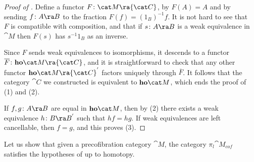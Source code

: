 \begin{proof}[Proof of ]
Define a functor $F \colon {\cat M} \ra {\cat C}$, by $F(A) = A$ and by sending $f \colon A \ra B$ to the fraction $F(f) = (1_B)^{-1}f$. It is not hard to see that $F$ is compatible with composition, and that if $s \colon A \ra B$ is a weak equivalence in ${\cat M}$ then $F(s)$ has $s^{-1}1_B$ as an inverse. 

Since $F$ sends weak equivalences to isomorphisms, it descends to a functor $\overline{F} \colon {\bf ho}{\cat M} \ra {\cat C}$, and it is straightforward to check that any other functor ${\bf ho}{\cat M} \ra {\cat C}^{'}$ factors uniquely through $\overline{F}$. It follows that the category ${\cat C}$ we constructed is equivalent to ${\bf ho}{\cat M}$, which ends the proof of (1) and (2).

If $f, g \colon A \ra B$ are equal in ${\bf ho}{\cat M}$, then by (2) there exists a weak equivalence $h \colon B \ra B^{'}$ such that $hf = hg$. If weak equivalences are left cancellable, then $f = g$, and this proves (3).
\end{proof}

Let us show that given a precofibration category ${\cat M}$, the category $\pi_l {\cat M}_{cof}$ satisfies the hypotheses of  up to homotopy.

